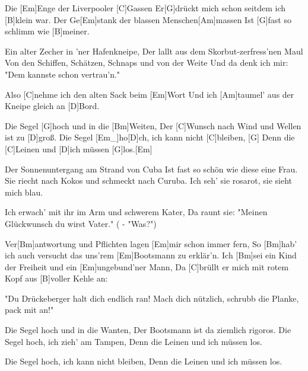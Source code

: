 

\begin{guitar}
	Die [Em]Enge der Liverpooler [C]Gassen
	Er[G]drückt mich schon seitdem ich [B]klein war.
	Der Ge[Em]stank der blassen Menschen[Am]massen
	Ist [G]fast so schlimm wie [B]meiner.
	
	Ein alter Zecher in 'ner Hafenkneipe,
	Der lallt aus dem Skorbut-zerfress'nen Maul
	Von den Schiffen, Schätzen, Schnaps und von der Weite
	Und da denk ich mir: "Dem kannste schon vertrau'n."
	
	Also [C]nehme ich den alten Sack beim [Em]Wort
	Und ich [Am]taumel' aus der Kneipe gleich an [D]Bord.
	
	Die Segel [G]hoch und in die [Bm]Weiten,
	Der [C]Wunsch nach Wind und Wellen ist zu [D]groß.
	Die Segel [Em_]{ho}[D]ch, ich kann nicht [C]bleiben, [G]{}
	Denn die [C]Leinen und [D]ich müssen [G]los.[Em]{}
	
	Der Sonnenuntergang am Strand von Cuba
	Ist fast so schön wie diese eine Frau.
	Sie riecht nach Kokos und schmeckt nach Curuba.
	Ich seh' sie rosarot, sie sieht mich blau.
	
	Ich erwach' mit ihr im Arm und schwerem Kater,
	Da raunt sie: "Meinen Glückwunsch du wirst Vater." ( - "Was?")
	
	 
	
	\pagebreak
	
	Ver[Bm]antwortung und Pflichten lagen [Em]mir schon immer fern,
	So [Bm]hab' ich auch versucht das uns'rem [Em]Bootsmann zu erklär'n.
	Ich [Bm]sei ein Kind der Freiheit und ein [Em]ungebund'ner Mann,
	Da [C]brüllt er mich mit rotem Kopf aus [B]voller Kehle an:
	
	"Du Drückeberger halt dich endlich ran!
	Mach dich nützlich, schrubb die Planke, pack mit an!"
	
	Die Segel hoch und in die Wanten,
	Der Bootsmann ist da ziemlich rigoros.
	Die Segel hoch, ich zieh' am Tampen,
	Denn die Leinen und ich müssen los.
	
	 
	Die Segel hoch, ich kann nicht bleiben,
	Denn die Leinen und ich müssen los.
	
\end{guitar}
